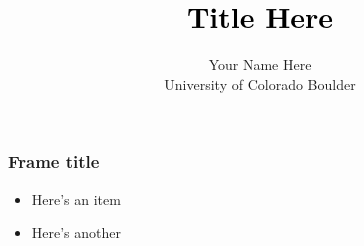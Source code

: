 \documentclass[mathserif,ignorenonframetext]{beamer}
\title[CU Boulder]{\textcolor{black}{Title Here}}
\author[\copyright\ Last Name 2017]{
Your Name Here\\ \bigskip 
{\small University of Colorado Boulder} }
\date{}
\begin{document}
\frame{\titlepage}





\begin{frame}\frametitle{Frame title}

\begin{itemize}\setlength\itemsep{1em}
\item Here's an item\pause
\item Here's another
\end{itemize}	
\end{frame}



\end{document}
